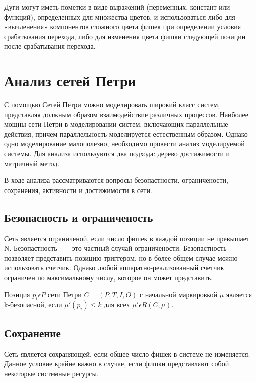 Дуги могут иметь пометки в виде выражений (переменных, констант или функций), определенных для множества цветов, и использоваться либо для «вычленения» компонентов сложного цвета фишек при определении условия срабатывания перехода, либо для изменения цвета фишки следующей позиции после срабатывания перехода. \cite{Kristensen}

\section{Анализ сетей Петри}

С помощью Сетей Петри можно моделировать широкий класс систем, представляя должным образом взаимодействие различных процессов. Наиболее мощны сети Петри в моделировании систем, включающих параллельные действия, причем параллельность моделируется естественным образом. Однако одно моделирование малополезно, необходимо провести анализ моделируемой системы. Для анализа используются два подхода: дерево достижимости и матричный метод.

В ходе анализа рассматриваются вопросы безопастности, ограничености, сохранения, активности и достижимости в сети.
\subsection*{Безопасность и ограниченость}
Сеть является ограниченой, если число фишек в каждой позиции не превышает N. Безопастность ~--- это частный случай ограничености. Безопастность позволяет представить позицию триггером, но в более общем случае можно использовать счетчик. Однако любой аппаратно-реализованный счетчик ограничен по максимальному числу, которое он может представить.

Позиция $ p_{i} \epsilon P $ сети Петри $ C = (P, T, I, O) $ с начальной маркировкой $ \mu $ является k-безопасной, если $ \mu'(p_{i}) \leqslant k $ для всех $ \mu' \epsilon R(C, \mu) $.

\subsection*{Сохранение}
Сеть является сохраняющей, если общее число фишек в системе не изменяется. Данное условие крайне важно в случае, если фишки представляют собой некоторые системные ресурсы.

